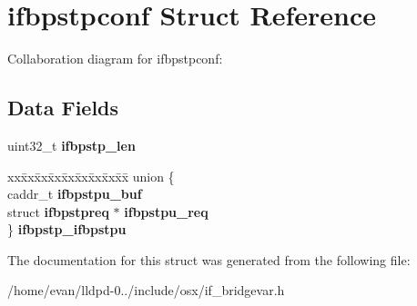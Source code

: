 \section{ifbpstpconf \-Struct \-Reference}
\label{structifbpstpconf}


\-Collaboration diagram for ifbpstpconf\-:
\subsection*{\-Data \-Fields}
\begin{DoxyCompactItemize}
\item 
uint32\-\_\-t {\bfseries ifbpstp\-\_\-len}\label{structifbpstpconf_a4ac1e98db3ff8c9b2a3de0dbba608d04}

\item 
\begin{tabbing}
xx\=xx\=xx\=xx\=xx\=xx\=xx\=xx\=xx\=\kill
union \{\\
\>caddr\_t {\bfseries ifbpstpu\_buf}\\
\>struct {\bf ifbpstpreq} $\ast$ {\bfseries ifbpstpu\_req}\\
\} {\bfseries ifbpstp\_ifbpstpu}\label{structifbpstpconf_aa455bf6461541f7043063efd1808bb15}
\\

\end{tabbing}\end{DoxyCompactItemize}


\-The documentation for this struct was generated from the following file\-:\begin{DoxyCompactItemize}
\item 
/home/evan/lldpd-\/0../include/osx/if\-\_\-bridgevar.\-h\end{DoxyCompactItemize}
